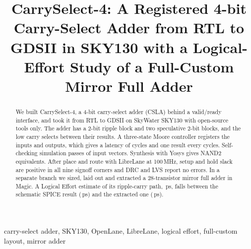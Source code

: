 \documentclass[conference]{IEEEtran}
\begin{document}
\title{CarrySelect-4: A Registered 4-bit Carry-Select Adder from RTL to GDSII in SKY130 with a Logical-Effort Study of a Full-Custom Mirror Full Adder}

\author{
}

\maketitle

\begin{abstract}
We built CarrySelect-4, a 4-bit carry-select adder (CSLA) behind a valid/ready interface, and took it
from RTL to GDSII on SkyWater SKY130 with open-source tools only. The adder has a 2-bit ripple block
and two speculative 2-bit blocks, and the low carry selects between their results. A three-state Moore
controller registers the inputs and outputs, which gives a latency of 
cycles and one result every  cycles. Self-checking simulation passes
 of  input vectors. Synthesis with Yosys
gives  NAND2 equivalents. After place and route with LibreLane at 100\,MHz,
setup and hold slack are positive in all nine signoff corners and DRC and LVS report no errors. In a
separate branch we sized, laid out and extracted a 28-transistor mirror full adder in Magic. A Logical
Effort estimate of its ripple-carry path, \,ps, falls between the schematic SPICE
result (\,ps) and the extracted one (\,ps).
\end{abstract}

\begin{IEEEkeywords}
carry-select adder, SKY130, OpenLane, LibreLane, logical effort, full-custom layout, mirror adder
\end{IEEEkeywords}
\end{document}
